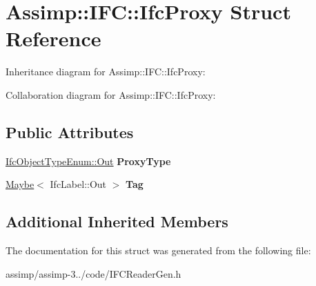 \hypertarget{struct_assimp_1_1_i_f_c_1_1_ifc_proxy}{\section{Assimp\+:\+:I\+F\+C\+:\+:Ifc\+Proxy Struct Reference}
\label{struct_assimp_1_1_i_f_c_1_1_ifc_proxy}
}


Inheritance diagram for Assimp\+:\+:I\+F\+C\+:\+:Ifc\+Proxy\+:


Collaboration diagram for Assimp\+:\+:I\+F\+C\+:\+:Ifc\+Proxy\+:
\subsection*{Public Attributes}
\begin{DoxyCompactItemize}
\item 
\hypertarget{struct_assimp_1_1_i_f_c_1_1_ifc_proxy_a39603339c2e2e0abbf0e28e58571ce97}{\hyperlink{classboost_1_1shared__ptr}{Ifc\+Object\+Type\+Enum\+::\+Out} {\bfseries Proxy\+Type}}\label{struct_assimp_1_1_i_f_c_1_1_ifc_proxy_a39603339c2e2e0abbf0e28e58571ce97}

\item 
\hypertarget{struct_assimp_1_1_i_f_c_1_1_ifc_proxy_a4bd4403adae2ea87e3a9118861d65f39}{\hyperlink{struct_assimp_1_1_s_t_e_p_1_1_maybe}{Maybe}$<$ Ifc\+Label\+::\+Out $>$ {\bfseries Tag}}\label{struct_assimp_1_1_i_f_c_1_1_ifc_proxy_a4bd4403adae2ea87e3a9118861d65f39}

\end{DoxyCompactItemize}
\subsection*{Additional Inherited Members}


The documentation for this struct was generated from the following file\+:\begin{DoxyCompactItemize}
\item 
assimp/assimp-\/3../code/I\+F\+C\+Reader\+Gen.\+h\end{DoxyCompactItemize}
